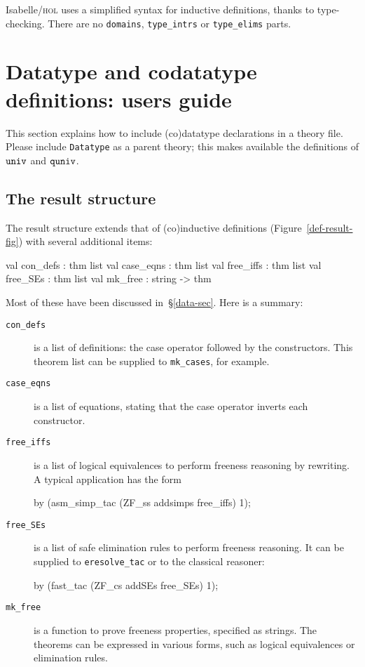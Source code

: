 \documentclass[12pt]{article}
\newcommand\univ{\hbox{\tt univ}}
\newcommand\quniv{\hbox{\tt quniv}}
\begin{document}
Isabelle/\textsc{hol} uses a simplified syntax for inductive definitions,
thanks to type-checking.  There are no \texttt{domains}, \texttt{type\_intrs}
or \texttt{type\_elims} parts.


\section{Datatype and codatatype definitions: users guide}
This section explains how to include (co)datatype declarations in a theory
file.  Please include {\tt Datatype} as a parent theory; this makes available
the definitions of $\univ$ and $\quniv$.


\subsection{The result structure}
The result structure extends that of (co)inductive definitions
(Figure~\ref{def-result-fig}) with several additional items:
\begin{ttbox}
val con_defs  : thm list
val case_eqns : thm list
val free_iffs : thm list
val free_SEs  : thm list
val mk_free   : string -> thm
\end{ttbox}
Most of these have been discussed in~\S\ref{data-sec}.  Here is a summary:
\begin{description}
\item[\tt con\_defs] is a list of definitions: the case operator followed by
the constructors.  This theorem list can be supplied to \verb|mk_cases|, for
example.

\item[\tt case\_eqns] is a list of equations, stating that the case operator
inverts each constructor.

\item[\tt free\_iffs] is a list of logical equivalences to perform freeness
reasoning by rewriting.  A typical application has the form
\begin{ttbox}
by (asm_simp_tac (ZF_ss addsimps free_iffs) 1);
\end{ttbox}

\item[\tt free\_SEs] is a list of safe elimination rules to perform freeness
reasoning.  It can be supplied to \verb|eresolve_tac| or to the classical
reasoner:
\begin{ttbox} 
by (fast_tac (ZF_cs addSEs free_SEs) 1);
\end{ttbox}

\item[\tt mk\_free] is a function to prove freeness properties, specified as
strings.  The theorems can be expressed in various forms, such as logical
equivalences or elimination rules.
\end{description}
\end{document}
